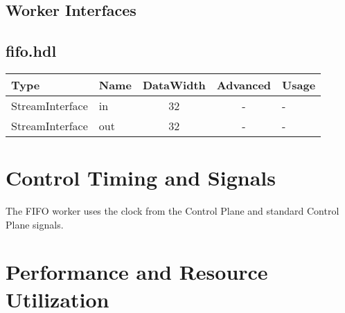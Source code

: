 \documentclass{article}
\def\comp{fifo}
\begin{document}
\begin{landscape}
  \section*{Worker Interfaces}
  \subsection*{\comp.hdl}
  \begin{scriptsize}
    \begin{tabular}{|M{2cm}|M{1.5cm}|c|c|M{14.5cm}|}
      \hline
      Type            & Name & DataWidth & Advanced                & Usage                  \\
      \hline
      StreamInterface & in   & 32        & - & - \\
      \hline
      StreamInterface & out  & 32        & - & - \\
      \hline
    \end{tabular}
  \end{scriptsize}
\end{landscape}

\section*{Control Timing and Signals}
\begin{flushleft}
  The FIFO worker uses the clock from the Control Plane and standard Control Plane signals.
\end{flushleft}

\section*{Performance and Resource Utilization}
\end{document}
